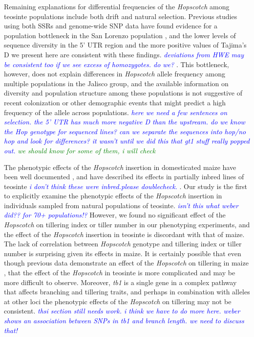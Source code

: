 \documentclass[11pt]{article}
\newcommand{\jri}[1]{\textcolor{blue}{ \emph{\scriptsize  #1}} }
\newcommand{\lev}[1]{\textcolor{green}{\emph{\scriptsize #1}} }
\begin{document}
\begin{linenumbers}
\begin{flushleft}
Remaining explanations for differential frequencies of the \emph{Hopscotch} among teosinte populations include both drift and natural selection.  Previous studies using both SSRs and genome-wide SNP data have found evidence for a population bottleneck in the San Lorenzo population \citep{Hufford2010, Pyhajarvi2013}, and the lower levels of sequence diversity in the 5' UTR region and the more positive values of Tajima's D we present here are consistent with these findings. \jri{deviations from HWE may be consistent too if we see excess of homozygotes. do we?}. This bottleneck, however, does not explain differences in \emph{Hopscotch} allele frequency among multiple populations in the Jalisco group, and the available information on diversity and population structure among these populations \citep{Hufford2010, Pyhajarvi2013} is not suggestive of recent colonization or other demographic events that might predict a high frequency of the allele across populations.  \jri{here we need a few sentences on selection.  the 5' UTR has much more negative D than the upstream. do we know the Hop genotype for sequenced lines? can we separate the sequences into hop/no hop and look for differences? it wasn't until we did this that gt1 stuff really popped out.} \lev{we should know for some of them, i will check}

The phenotypic effects of the \emph{Hopscotch} insertion in domesticated maize have been well documented \citep{Clark2006, Studer2011}, and \citet{Weber2007} have described its effects in partially inbred lines of teosinte \citep{Weber2007} \jri{i don't think these were inbred.please doublecheck.}. Our study is the first to explicitly examine the phenotypic effects of the \emph{Hopscotch} insertion in individuals sampled from natural populations of teosinte. \jri{isn't this what weber did?? for 70+ populations!?} However, we found no significant effect of the \emph{Hopscotch} on tillering index or tiller number in our phenotyping experiments, and the effect of the \emph{Hopscotch} insertion in teosinte is discordant with that of maize. The lack of correlation between \emph{Hopscotch} genotype and tillering index or tiller number is surprising given its effects in maize. It is certainly possible that even though previous data demonstrate an effect of the \emph{Hopscotch} on tillering in maize \citep{Studer2011}, that the effect of the \emph{Hopscotch} in teosinte is more complicated and may be more difficult to observe. Moreover, \emph{tb1} is a single gene in a complex pathway that affects branching and tillering traits, and perhaps in combination with alleles at other loci the phenotypic effects of the \emph{Hopscotch} on tillering may not be consistent. \jri{thsi section still needs work. i think we have to do more here. weber shows an association between SNPs in tb1 and branch length. we need to discuss that!}


\end{flushleft}
\end{linenumbers}
\end{document}
